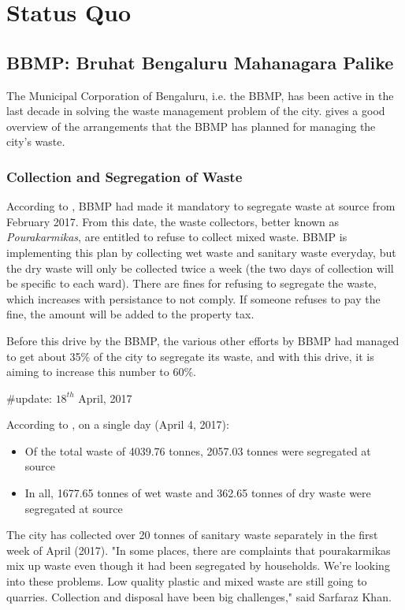 \documentclass[10pt]{article}
\begin{document}

\section{Status Quo}



\subsection{BBMP: Bruhat Bengaluru Mahanagara Palike}

The Municipal Corporation of Bengaluru, i.e. the BBMP, has been active in the last decade in solving the waste management problem of the city. \cite{BBMP:SWMOverview} gives a good overview of the arrangements that the BBMP has planned for managing the city's waste.

\subsubsection{Collection and Segregation of Waste}

According to \cite{theHindu:segregation_at_source_31Jan2017}, BBMP had made it mandatory to segregate waste at source from February 2017. From this date, the waste collectors, better known as \textit{Pourakarmikas}, are entitled to refuse to collect mixed waste. BBMP is implementing this plan by collecting wet waste and sanitary waste everyday, but the dry waste will only be collected twice a week (the two days of collection will be specific to each ward).
There are fines for refusing to segregate the waste, which increases with persistance to not comply. If someone refuses to pay the fine, the amount will be added to the property tax.

Before this drive by the BBMP, the various other efforts by BBMP had managed to get about 35\% of the city to segregate its waste, and with this drive, it is aiming to increase this number to 60\%.

\#update: $18^{th}$ April, 2017

According to \cite{ToI:segregation_at_source}, on a single day (April 4, 2017):
\begin{itemize}
	\item Of the total waste of 4039.76 tonnes, 2057.03 tonnes were segregated at source
	\item In all, 1677.65 tonnes of wet waste and 362.65 tonnes of dry waste were segregated at source
\end{itemize}
The city has collected over 20 tonnes of sanitary waste separately in the first week of April (2017).
 "In some places, there are complaints that pourakarmikas mix up waste even though it had been segregated by households. We're looking into these problems. Low quality plastic and mixed waste are still going to quarries. Collection and disposal have been big challenges," said Sarfaraz Khan.
\end{document}
